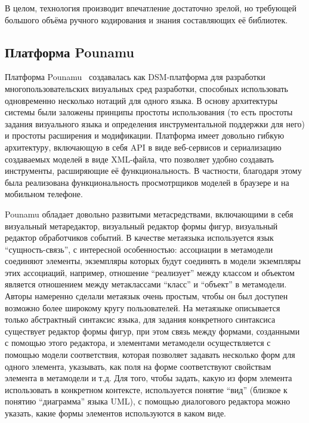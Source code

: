 В целом, технология производит впечатление достаточно зрелой, но требующей большого
объёма ручного кодирования и знания составляющих её библиотек. 

\subsection{Платформа Pounamu}
Платформа Pounamu~\cite{zhu2007pounamu} создавалась как DSM-платформа для разработки 
многопользовательских визуальных сред разработки, способных использовать одновременно 
несколько нотаций для одного языка. В основу архитектуры системы были заложены принципы 
простоты использования (то есть простоты задания визуального языка и определения инструментальной 
поддержки для него) и простоты расширения и модификации. Платформа имеет довольно 
гибкую архитектуру, включающую в себя API в виде веб-сервисов и сериализацию создаваемых 
моделей в виде XML-файла, что позволяет удобно создавать инструменты, расширяющие её 
функциональность. В частности, благодаря этому была реализована функциональность просмотрщиков 
моделей в браузере и на мобильном телефоне.

Pounamu обладает довольно развитыми метасредствами, включающими в себя визуальный 
метаредактор, визуальный редактор формы фигур, визуальный редактор обработчиков событий. 
В качестве метаязыка используется язык "`сущность-связь"', с интересной особенностью: 
ассоциации в метамодели соединяют элементы, экземпляры которых будут соединять в модели 
экземпляры этих ассоциаций, например, отношение “реализует” между классом и объектом 
является отношением между метаклассами "`класс"' и "`объект"' в метамодели. Авторы 
намеренно сделали метаязык очень простым, чтобы он был доступен возможно более широкому 
кругу пользователей. На метаязыке описывается только абстрактный синтаксис языка, для 
задания конкретного синтаксиса существует редактор формы фигур, при этом связь между 
формами, созданными с помощью этого редактора, и элементами метамодели осуществляется 
с помощью модели соответствия, которая позволяет задавать несколько форм для одного 
элемента, указывать, как поля на форме соответствуют свойствам элемента в метамодели 
и т.д. Для того, чтобы задать, какую из форм элемента использовать в конкретном контексте, 
используется понятие "`вид"' (близкое к понятию "`диаграмма"' языка UML), с помощью 
диалогового редактора можно указать, какие формы элементов используются в каком виде.


